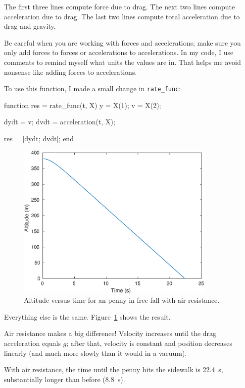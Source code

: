 \documentclass[
]{book}
\numberwithin{Answer}{chapter}
\numberwithin{Exercise}{chapter}
\begin{document}
The first three lines compute force due to drag.
The next two lines compute acceleration due to drag.
The last two lines compute total acceleration due to drag and gravity.

Be careful when you are working with forces and accelerations; make sure
you only add forces to forces or accelerations to accelerations.  In my
code, I use comments to remind myself what units the values are in.
That helps me avoid nonsense like adding forces to accelerations.

To use this function, I made a small change in \verb"rate_func":

\begin{code}
function res = rate_func(t, X)
    y = X(1);      
    v = X(2);      
    
    dydt = v;
    dvdt = acceleration(t, X);   %

    res = [dydt; dvdt];
end

\end{code}

\begin{figure}
\centerline{\includegraphics[height=3in]{figs/penny2.eps}}
\caption{Altitude versus time for an penny in free fall with air resistance.}
\label{fig:penny2}
\end{figure}

Everything else is the same.
Figure~\ref{fig:penny2} shows the result. 

Air resistance makes a big difference!  Velocity increases until
the drag acceleration equals $g$; after that, velocity is constant and position decreases linearly (and much more slowly than it would in a vacuum). 

With air resistance, the time until the penny hits the sidewalk is \SI{22.4}{\second}, substantially longer than before (\SI{8.8}{\second}).
\end{document}
